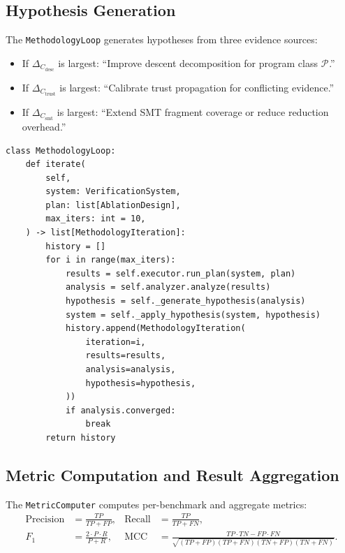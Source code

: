 \documentclass[11pt]{article}
\newcommand{\Impact}[1]{\Delta_{\!#1}}      %
\newcommand{\PClass}[1]{\mathcal{P}_{#1}}   %
\newcommand{\DescComp}{C_{\mathrm{desc}}}   %
\newcommand{\TrustComp}{C_{\mathrm{trust}}} %
\newcommand{\SMTComp}{C_{\mathrm{smt}}}     %
\begin{document}
\subsection{Hypothesis Generation}
\label{subsec:hypothesis}

The \texttt{MethodologyLoop} generates hypotheses from three evidence
sources:
\begin{itemize}
\item If $\Impact{\DescComp}$ is largest: ``Improve descent
  decomposition for program class $\PClass{}$.''
\item If $\Impact{\TrustComp}$ is largest: ``Calibrate trust
  propagation for conflicting evidence.''
\item If $\Impact{\SMTComp}$ is largest: ``Extend SMT fragment
  coverage or reduce reduction overhead.''
\end{itemize}

\begin{lstlisting}[style=jugeo-python,caption={MethodologyLoop.iterate (evaluation\_loop.py)}]
class MethodologyLoop:
    def iterate(
        self,
        system: VerificationSystem,
        plan: list[AblationDesign],
        max_iters: int = 10,
    ) -> list[MethodologyIteration]:
        history = []
        for i in range(max_iters):
            results = self.executor.run_plan(system, plan)
            analysis = self.analyzer.analyze(results)
            hypothesis = self._generate_hypothesis(analysis)
            system = self._apply_hypothesis(system, hypothesis)
            history.append(MethodologyIteration(
                iteration=i,
                results=results,
                analysis=analysis,
                hypothesis=hypothesis,
            ))
            if analysis.converged:
                break
        return history
\end{lstlisting}

\subsection{Metric Computation and Result Aggregation}
\label{subsec:metric-aggregation}

The \texttt{MetricComputer} computes per-benchmark and aggregate
metrics:
\begin{align*}
  \mathrm{Precision}  &= \frac{TP}{TP + FP}, &
  \mathrm{Recall}     &= \frac{TP}{TP + FN}, \\
  F_1                 &= \frac{2 \cdot P \cdot R}{P + R}, &
  \mathrm{MCC}        &= \frac{TP \cdot TN - FP \cdot FN}
                          {\sqrt{(TP+FP)(TP+FN)(TN+FP)(TN+FN)}}.
\end{align*}
\end{document}
